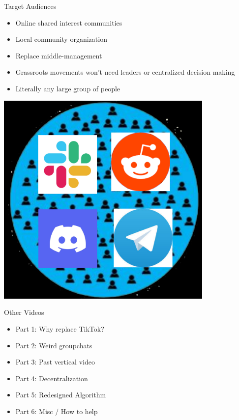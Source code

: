\documentclass[aspectratio=35]{beamer} %
\begin{document}
\begin{frame}{Target Audiences}
\vspace{-0.4in}
\begin{itemize}
    \item Online shared interest communities
    \item Local community organization
    \item Replace middle-management
    \item Grassroots movements won't need leaders or centralized decision making
    \item Literally any large group of people
\end{itemize}
\centering
\includegraphics[width=0.8\textwidth]{imgs/CSI_section/competition.png}
\end{frame}

\begin{frame}{Other Videos}
\centering
\tiny
\vspace{-1.5in}
\begin{itemize}
    \item Part 1: Why replace TikTok?
    \item Part 2: Weird groupchats 
    \item Part 3: Past vertical video
    \item Part 4: Decentralization
    \item Part 5: Redesigned Algorithm
    \item Part 6: Misc / How to help
\end{itemize}
\end{frame}
\end{document}
